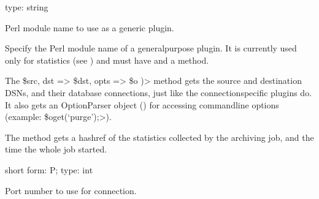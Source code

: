 \documentclass[letterpaper,10pt,english]{sphinxmanual}
\begin{document}
\begin{fulllineitems}
\label{\detokenize{mariadb-archiver:cmdoption-mariadb-archiver-plugin}}
type: string

Perl module name to use as a generic plugin.

Specify the Perl module name of a general\sphinxhyphen{}purpose plugin.  It is currently used
only for statistics (see {\hyperref[\detokenize{mariadb-archiver:cmdoption-mariadb-archiver-statistics}]{}}) and must have  and a
 method.

The  \$src, dst =\textgreater{} \$dst, opts =\textgreater{} \$o )\textgreater{} method gets the source
and destination DSNs, and their database connections, just like the
connection\sphinxhyphen{}specific plugins do.  It also gets an OptionParser object () for
accessing command\sphinxhyphen{}line options (example: {\color{red}\bfseries{}\textasciigrave{}\textasciigrave{}}\$o\sphinxhyphen{}{\color{red}\bfseries{}\textasciigrave{}\textasciigrave{}}get(‘purge’);\textgreater{}).

The  method gets a hashref of the statistics
collected by the archiving job, and the time the whole job started.

\end{fulllineitems}


\begin{fulllineitems}
\label{\detokenize{mariadb-archiver:cmdoption-mariadb-archiver-port}}
short form: \sphinxhyphen{}P; type: int

Port number to use for connection.

\end{fulllineitems}
\end{document}
